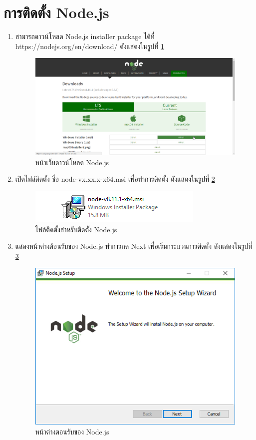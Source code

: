 \section{การติดตั้ง Node.js}
\begin{enumerate}
	\item สามารถดาวน์โหลด Node.js installer package ได้ที่ https://nodejs.org/en/download/ ดังแสดงในรูปที่ \ref{Fig:nodeInstall1}
	\begin{figure}[H]
		\includegraphics[width=\columnwidth]{Figures/7/1}
		\caption{หน้าเว็บดาวน์โหลด Node.js}
		\label{Fig:nodeInstall1}
	\end{figure}
	
	\item เปิดไฟล์ติดตั้ง ชื่อ node-vx.xx.x-x64.msi เพื่อทำการติดตั้ง ดังแสดงในรูปที่ \ref{Fig:nodeInstall2}
	\begin{figure}[H]
		\includegraphics[width=\columnwidth]{Figures/7/2}
		\caption{ไฟล์ติดตั้งสำหรับติดตั้ง Node.js}
		\label{Fig:nodeInstall2}
	\end{figure}
	
	\item แสดงหน้าต่างต้อนรับของ Node.js ทำการกด Next เพื่อเริ่มกระบวนการติดตั้ง ดังแสดงในรูปที่ \ref{Fig:nodeInstall3}
	\begin{figure}[H]
		\centering
		\includegraphics[width=0.7\columnwidth]{Figures/7/3}
		\caption{หน้าต่างตอนรับของ Node.js}
		\label{Fig:nodeInstall3}
	\end{figure}
	

\end{enumerate}

